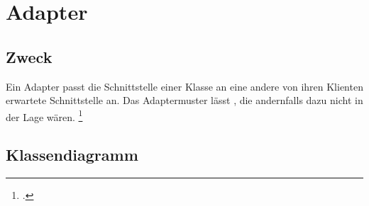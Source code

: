 \documentclass{lehramt-informatik-haupt}
\begin{document}

\chapter{Adapter}

\begin{quellen}
\item \cite{wiki:adapter}
\item \cite[Seite 120-129]{gof}
\item \cite[Kapitel 8., Seite 255]{schatten}
\item \cite[Kapitel 5.1, Seite 77-79]{eilebrecht}
\item \cite[Kapitel 20, Seite 243]{siebler}
\end{quellen}

\section{Zweck}

Ein Adapter passt die Schnittstelle einer Klasse an eine andere von
ihren Klienten erwartete Schnittstelle an. Das Adaptermuster lässt
, die andernfalls dazu nicht in der Lage
wären.
\footcite[Seite 77]{eilebrecht}

%

\section{Klassendiagramm}


%
\end{document}
